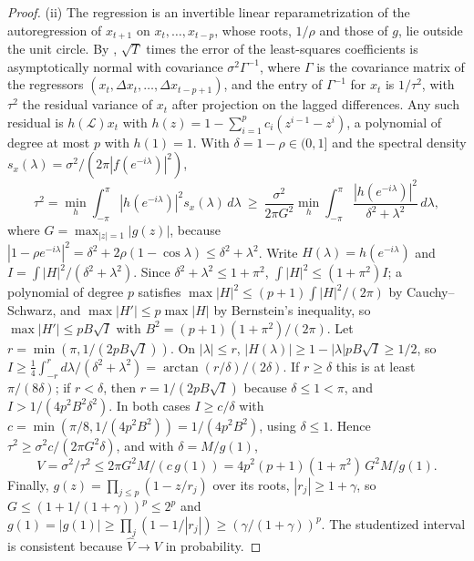 \begin{proof}
(ii) The regression is an invertible linear reparametrization of the autoregression of $x_{t+1}$ on $x_t,\dots,x_{t-p}$, whose roots, $1/\rho$ and those of $g$, lie outside the unit circle. By \citet{t:mannwald1943}, $\sqrt T$ times the error of the least-squares coefficients is asymptotically normal with covariance $\sigma^2\Gamma^{-1}$, where $\Gamma$ is the covariance matrix of the regressors $(x_t,\Delta x_t,\dots,\Delta x_{t-p+1})$, and the entry of $\Gamma^{-1}$ for $x_t$ is $1/\tau^2$, with $\tau^2$ the residual variance of $x_t$ after projection on the lagged differences. Any such residual is $h(\mathcal L)x_t$ with $h(z)=1-\sum_{i=1}^pc_i(z^{i-1}-z^i)$, a polynomial of degree at most $p$ with $h(1)=1$. With $\delta=1-\rho\in(0,1]$ and the spectral density $s_x(\lambda)=\sigma^2/(2\pi|f(e^{-i\lambda})|^2)$,
\[
\tau^2=\min_h\int_{-\pi}^{\pi}|h(e^{-i\lambda})|^2s_x(\lambda)\,d\lambda\ \ge\ \frac{\sigma^2}{2\pi G^2}\min_h\int_{-\pi}^{\pi}\frac{|h(e^{-i\lambda})|^2}{\delta^2+\lambda^2}\,d\lambda,
\]
where $G=\max_{|z|=1}|g(z)|$, because $|1-\rho e^{-i\lambda}|^2=\delta^2+2\rho(1-\cos\lambda)\le\delta^2+\lambda^2$. Write $H(\lambda)=h(e^{-i\lambda})$ and $I=\int|H|^2/(\delta^2+\lambda^2)$. Since $\delta^2+\lambda^2\le1+\pi^2$, $\int|H|^2\le(1+\pi^2)I$; a polynomial of degree $p$ satisfies $\max|H|^2\le(p+1)\int|H|^2/(2\pi)$ by Cauchy--Schwarz, and $\max|H'|\le p\max|H|$ by Bernstein's inequality, so $\max|H'|\le pB\sqrt I$ with $B^2=(p+1)(1+\pi^2)/(2\pi)$. Let $r=\min(\pi,1/(2pB\sqrt I))$. On $|\lambda|\le r$, $|H(\lambda)|\ge1-|\lambda|pB\sqrt I\ge1/2$, so $I\ge\frac14\int_{-r}^{r}d\lambda/(\delta^2+\lambda^2)=\arctan(r/\delta)/(2\delta)$. If $r\ge\delta$ this is at least $\pi/(8\delta)$; if $r<\delta$, then $r=1/(2pB\sqrt I)$ because $\delta\le1<\pi$, and $I>1/(4p^2B^2\delta^2)$. In both cases $I\ge c/\delta$ with $c=\min(\pi/8,1/(4p^2B^2))=1/(4p^2B^2)$, using $\delta\le1$. Hence $\tau^2\ge\sigma^2c/(2\pi G^2\delta)$, and with $\delta=M/g(1)$,
\[
V=\sigma^2/\tau^2\le2\pi G^2M/(c\,g(1))=4p^2(p+1)(1+\pi^2)\,G^2M/g(1).
\]
Finally, $g(z)=\prod_{j\le p}(1-z/r_j)$ over its roots, $|r_j|\ge1+\gamma$, so $G\le(1+1/(1+\gamma))^p\le2^p$ and $g(1)=|g(1)|\ge\prod_j(1-1/|r_j|)\ge(\gamma/(1+\gamma))^p$. The studentized interval is consistent because $\hat V\to V$ in probability.
\end{proof}

